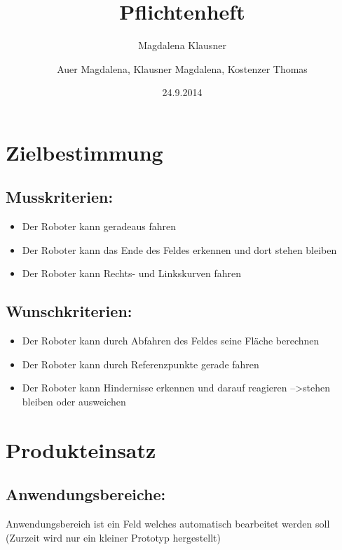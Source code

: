 \documentclass[12pt,a4paper]{article}
\author{Magdalena Klausner}
\newcommand{\changefont}[3]{
\fontfamily{#1}
\fontseries{#2}
\fontshape{#3}
\selectfont}
\begin{document}
\changefont{cmss}{m}{n}

\title{ Pflichtenheft}
\author{Auer Magdalena, Klausner Magdalena, Kostenzer Thomas }
\date{24.9.2014}
\centering{}

\newpage
\tableofcontents
\newpage


\section{ Zielbestimmung}
\subsection{ Musskriterien:}

\begin{itemize}
\item Der Roboter kann geradeaus fahren 
\item Der Roboter kann das Ende des Feldes erkennen und dort stehen bleiben
\item Der Roboter kann Rechts- und Linkskurven fahren
\end{itemize}


\subsection{Wunschkriterien:}
\begin{itemize}
\item Der Roboter kann durch Abfahren des Feldes seine Fläche berechnen 
\item Der Roboter kann durch Referenzpunkte gerade fahren
\item Der Roboter kann Hindernisse erkennen und darauf reagieren  --\textgreater stehen bleiben oder ausweichen
\end{itemize}


\section{ Produkteinsatz}

\subsection{Anwendungsbereiche:}

Anwendungsbereich ist ein Feld welches automatisch bearbeitet werden soll (Zurzeit wird nur ein kleiner Prototyp hergestellt)
\end{document}
